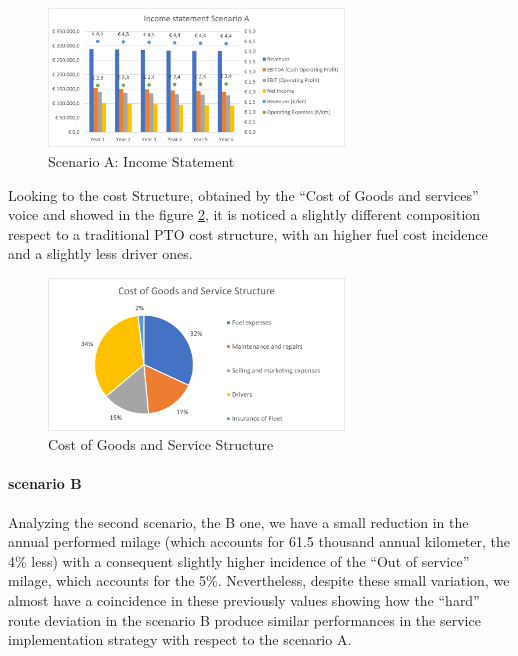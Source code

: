 \begin{figure}[h]
    \centering
    \includegraphics[width=0.7\textwidth]{Images/financial/income_statement_A.png}
    \caption{Scenario A: Income Statement}
    \label{fig:incstateA}
\end{figure}

Looking to the cost Structure, obtained by the “Cost of Goods and services” voice and showed in the figure \ref{fig:costgoodsservice}, it is noticed a slightly different composition respect to a traditional PTO cost structure, with an higher fuel cost incidence and a slightly less driver ones. 
\begin{figure}[h]
    \centering
    \includegraphics[width=0.7\textwidth]{Images/financial/Cost_of_Goods.png}
    \caption{Cost of Goods and Service Structure}
    \label{fig:costgoodsservice}
\end{figure}

\newpage
\paragraph{scenario B}
Analyzing the second scenario, the B one, we have a small reduction in the annual performed milage (which accounts for 61.5 thousand annual kilometer, the 4\% less) with a consequent slightly higher incidence of the “Out of service” milage, which accounts for the 5\%. Nevertheless, despite these small variation, we almost have a coincidence in these previously values showing how the “hard” route deviation in the scenario B produce similar performances in the service implementation strategy with respect to the scenario A.


